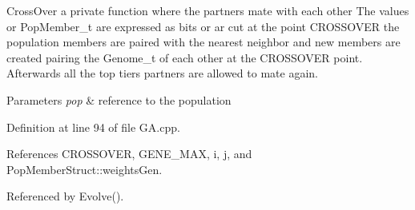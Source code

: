 Cross\+Over a private function where the partners mate with each other The values or Pop\+Member\+\_\+t are expressed as bits or ar cut at the point C\+R\+O\+S\+S\+O\+V\+E\+R the population members are paired with the nearest neighbor and new members are created pairing the Genome\+\_\+t of each other at the C\+R\+O\+S\+S\+O\+V\+E\+R point. Afterwards all the top tiers partners are allowed to mate again. 


\begin{DoxyParams}{Parameters}
{\em pop} & reference to the population \\
\hline
\end{DoxyParams}


Definition at line 94 of file G\+A.\+cpp.



References C\+R\+O\+S\+S\+O\+V\+E\+R, G\+E\+N\+E\+\_\+\+M\+A\+X, i, j, and Pop\+Member\+Struct\+::weights\+Gen.



Referenced by Evolve().


